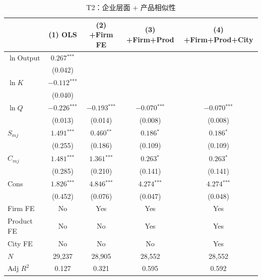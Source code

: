 \documentclass[12pt]{article}
\newcommand{\sym}[1]{\ensuremath{^{\text{#1}}}}
\newcommand{\se}[1]{{\small(#1)}}
\newcommand{\abs}{\textemdash}
\begin{document}
\begin{table}[H]
  \centering
  \caption{T2：企业层面 + 产品相似性}
  \begin{threeparttable}
    \begin{tabular}{lcccc}
      \toprule
       & (1) OLS & (2) +Firm FE & (3) +Firm+Prod & (4) +Firm+Prod+City \\
      \midrule
      $\ln\mathrm{Output}$ & $0.267\sym{***}$ & \abs & \abs & \abs \\
                           & \se{0.042}       &     &     &     \\[4pt]
      $\ln K$              & $-0.112\sym{***}$ & \abs & \abs & \abs \\
                           & \se{0.040}        &     &     &     \\[4pt]
      $\ln Q$              & $-0.226\sym{***}$ & $-0.193\sym{***}$ & $-0.070\sym{***}$ & $-0.070\sym{***}$ \\
                           & \se{0.013}        & \se{0.014}        & \se{0.008}        & \se{0.008} \\[4pt]
      $S_{mj}$             & $1.491\sym{***}$ & $0.460\sym{**}$ & $0.186\sym{*}$ & $0.186\sym{*}$ \\
                           & \se{0.255}       & \se{0.186}      & \se{0.109}     & \se{0.109} \\[4pt]
      $C_{mj}$             & $1.481\sym{***}$ & $1.361\sym{***}$ & $0.263\sym{*}$ & $0.263\sym{*}$ \\
                           & \se{0.285}       & \se{0.210}       & \se{0.141}     & \se{0.141} \\[4pt]
      Cons               & $1.826\sym{***}$ & $4.846\sym{***}$ & $4.274\sym{***}$ & $4.274\sym{***}$ \\
                           & \se{0.452}       & \se{0.076}       & \se{0.047}       & \se{0.048}       \\
      \midrule
      Firm FE              & No  & Yes & Yes & Yes \\
      Product FE           & No  & No  & Yes & Yes \\
      City FE              & No  & No  & No  & Yes \\
      $N$                  & 29,237 & 28,905 & 28,552 & 28,552 \\
      Adj $R^2$            & 0.127  & 0.321  & 0.595  & 0.592  \\
      \bottomrule
    \end{tabular}
  \end{threeparttable}
\end{table}
\end{document}
